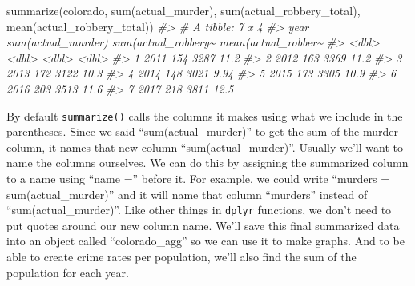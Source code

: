 \documentclass[
]{krantz}
\makeatletter
\newenvironment{Shaded}{\begin{snugshade}}{\end{snugshade}}
\newcommand{\CommentTok}[1]{\textcolor[rgb]{0.37,0.37,0.37}{\textit{#1}}}
\newcommand{\FunctionTok}[1]{\textcolor[rgb]{0,0,0}{#1}}
\newcommand{\NormalTok}[1]{#1}
\newenvironment{kframe}{%
\medskip{}
\setlength{\fboxsep}{.8em}
 \def\at@end@of@kframe{}%
 \ifinner\ifhmode%
  \def\at@end@of@kframe{\end{minipage}}%
  \begin{minipage}{\columnwidth}%
 \fi\fi%
 \def\FrameCommand##1{\hskip\@totalleftmargin \hskip-\fboxsep
 \colorbox{shadecolor}{##1}\hskip-\fboxsep
     \hskip-\linewidth \hskip-\@totalleftmargin \hskip\columnwidth}%
 \MakeFramed {\advance\hsize-\width
   \@totalleftmargin\z@ \linewidth\hsize
   \@setminipage}}%
 {\par\unskip\endMakeFramed%
 \at@end@of@kframe}
\renewenvironment{Shaded}{\begin{kframe}}{\end{kframe}}
\makeatother
\begin{document}
\begin{Shaded}
\begin{Highlighting}[]
\FunctionTok{summarize}\NormalTok{(colorado, }\FunctionTok{sum}\NormalTok{(actual\_murder),}
          \FunctionTok{sum}\NormalTok{(actual\_robbery\_total),}
          \FunctionTok{mean}\NormalTok{(actual\_robbery\_total))}
\CommentTok{\#\textgreater{} \# A tibble: 7 x 4}
\CommentTok{\#\textgreater{}    year \textasciigrave{}sum(actual\_murder)\textasciigrave{} \textasciigrave{}sum(actual\_robbery\textasciitilde{} \textasciigrave{}mean(actual\_robber\textasciitilde{}}
\CommentTok{\#\textgreater{}   \textless{}dbl\textgreater{}                \textless{}dbl\textgreater{}                \textless{}dbl\textgreater{}                \textless{}dbl\textgreater{}}
\CommentTok{\#\textgreater{} 1  2011                  154                 3287                11.2 }
\CommentTok{\#\textgreater{} 2  2012                  163                 3369                11.2 }
\CommentTok{\#\textgreater{} 3  2013                  172                 3122                10.3 }
\CommentTok{\#\textgreater{} 4  2014                  148                 3021                 9.94}
\CommentTok{\#\textgreater{} 5  2015                  173                 3305                10.9 }
\CommentTok{\#\textgreater{} 6  2016                  203                 3513                11.6 }
\CommentTok{\#\textgreater{} 7  2017                  218                 3811                12.5}
\end{Highlighting}
\end{Shaded}

By default \texttt{summarize()} calls the columns it makes using what we include in the parentheses. Since we said ``sum(actual\_murder)'' to get the sum of the murder column, it names that new column ``sum(actual\_murder)''. Usually we'll want to name the columns ourselves. We can do this by assigning the summarized column to a name using ``name ='' before it. For example, we could write ``murders = sum(actual\_murder)'' and it will name that column ``murders'' instead of ``sum(actual\_murder)''. Like other things in \texttt{dplyr} functions, we don't need to put quotes around our new column name. We'll save this final summarized data into an object called ``colorado\_agg'' so we can use it to make graphs. And to be able to create crime rates per population, we'll also find the sum of the population for each year.
\end{document}
